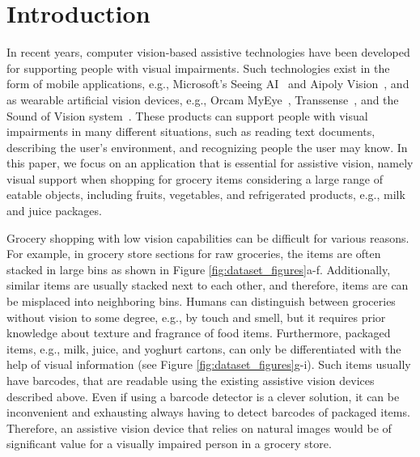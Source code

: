 \section{Introduction}
\label{paperB:sec:introduction}

In recent years, computer vision-based assistive technologies have been developed for supporting people with visual impairments.
Such technologies exist in the form of mobile applications, e.g., Microsoft's Seeing AI~ and Aipoly Vision~, and as wearable artificial vision devices, e.g., Orcam MyEye~, Transsense~, and the Sound of Vision system~. These products can support people with visual impairments in many different situations, such as reading text documents, describing the user's environment, and recognizing people the user may know. 
In this paper, we focus on an application that is essential for assistive vision, namely visual support when shopping for grocery items considering a large range of eatable objects, including fruits, vegetables, and refrigerated products, e.g., milk and juice packages.

Grocery shopping with low vision capabilities can be difficult for various reasons. For example, in grocery store sections for raw groceries, the items are often stacked in large bins as shown in Figure \ref{fig:dataset_figures}a-f. Additionally, similar items are usually stacked next to each other, and therefore, items are can be misplaced into neighboring bins. Humans can distinguish between groceries without vision to some degree, e.g., by touch and smell, but it requires prior knowledge about texture and fragrance of food items. 
Furthermore, packaged items, e.g., milk, juice, and yoghurt cartons, can only be differentiated with the help of visual information (see Figure \ref{fig:dataset_figures}g-i). 
Such items usually have barcodes, that are readable using the existing assistive vision devices described above. 
Even if using a barcode detector is a clever solution, it can be inconvenient and exhausting always having to detect barcodes of packaged items.
Therefore, an assistive vision device that relies on natural images would be of significant value for a visually impaired person in a grocery store. 

